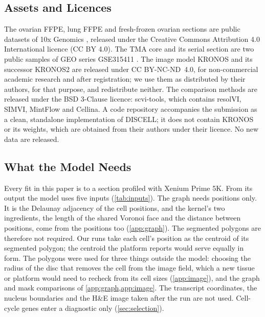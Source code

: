 



\subsection{Assets and Licences}
\label{app:assets}

The ovarian FFPE, lung FFPE and fresh-frozen ovarian sections are public datasets of 10x Genomics \citep{tenx_ovarian_ffpe,tenx_lung_ffpe,tenx_ovary_ff}, released under the Creative Commons Attribution 4.0 International licence (CC BY 4.0). The TMA core and its serial section are two public samples of GEO series GSE315411 \citep{williamskatek2026fishing}. The image model KRONOS and its successor KRONOS2 \citep{kronos2025} are released under CC BY-NC-ND~4.0, for non-commercial academic research and after registration; we use them as distributed by their authors, for that purpose, and redistribute neither. The comparison methods are released under the BSD 3-Clause licence: scvi-tools, which contains resolVI, SIMVI, MintFlow and Cellina. A code repository accompanies the submission as a clean, standalone implementation of DISCELL; it does not contain KRONOS or its weights, which are obtained from their authors under their licence. No new data are released.

\subsection{What the Model Needs}
\label{app:inputs}

 Every fit in this paper is to a section profiled with Xenium Prime 5K. From its output the model uses five inputs (\cref{tab:inputs}). The graph needs positions only. It is the Delaunay adjacency of the cell positions, and the kernel's two ingredients, the length of the shared Voronoi face and the distance between positions, come from the positions too (\cref{app:graph}). The segmented polygons are therefore not required. Our runs take each cell's position as the centroid of its segmented polygon; the centroid the platform reports would serve equally in form. The polygons were used for three things outside the model: choosing the radius of the disc that removes the cell from the image field, which a new tissue or platform would need to recheck from its cell sizes (\cref{app:image}), and the graph and mask comparisons of \cref{app:graph,app:image}. The transcript coordinates, the nucleus boundaries and the H\&E image taken after the run are not used. Cell-cycle genes enter a diagnostic only (\cref{sec:selection}).

